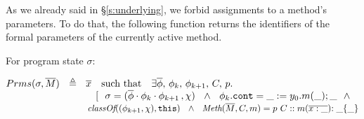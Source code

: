 As we already said in \S \ref{s:underlying}, we forbid assignments to a method's parameters. 
To do that, the following function returns the  identifiers of the formal parameters of the currently active method.



\begin{definition}
For program state $\sigma$:
\label{def:params}

$\Formals \sigma \Mtwo \ \ \triangleq \ \  \overline x \ \ \ \mbox{such that} \ \  \  \exists \overline {\phi},\,\phi_k, \, \phi_{k+1}, \,C,\,p.$\\
$\strut \hspace{3.2cm} [   \ \ \sigma =  (\overline {\phi}\cdot{\phi_k}\cdot{\phi_{k+1}}\,, \chi) 
\  \ \wedge\  \ \phi_k.\prg{cont}=\_:=y_0.m(\_); \_ \  \  \wedge\ \ $\\
$\strut \hspace{3.2cm} \class{(\phi_{k+1},\chi)}  {\prg{this} }\  \ \wedge\ \ \meth{\Mtwo} {C} {m} = p \ C::m(\overline{x : \_}){:\_}\{\_\}  $
\end{definition}








